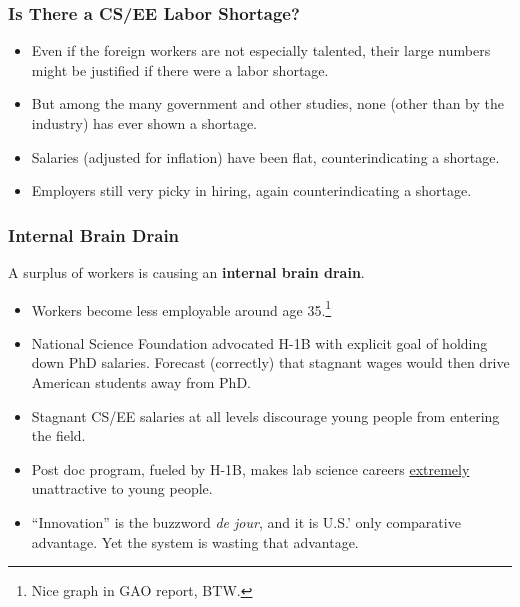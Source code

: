 \documentclass{beamer}
\begin{document}
\begin{frame}
\frametitle{Is There a CS/EE Labor Shortage?}

\pause

\begin{itemize}

\item Even if the foreign workers are not especially talented, their
large numbers might be justified if there were a labor shortage.
\pause

\item But among the many government and other studies, none (other than
by the industry) has ever shown a shortage.  
\pause

\item Salaries (adjusted for inflation) have been flat, 
counterindicating a shortage.  
\pause

\item Employers still very picky in hiring, again counterindicating a
shortage.

\end{itemize}

\end{frame}

\begin{frame}
\frametitle{Internal Brain Drain}

\pause

A surplus of workers is causing an {\bf internal brain drain}.
\pause

\begin{itemize}

\item Workers become less employable around age 35.\footnote{Nice graph
in GAO report, BTW.} 
\pause

\item National Science Foundation advocated H-1B with explicit goal of
holding down PhD salaries.
\pause
Forecast (correctly) that stagnant wages would then drive American 
students away from PhD.  
\pause 

\item Stagnant CS/EE salaries at all levels discourage young people from
entering the field.
\pause

\item Post doc program, fueled by H-1B, makes lab science careers
\underline{extremely} unattractive to young people.
\pause

\item ``Innovation'' is the buzzword {\it de jour}, and it is U.S.' only
comparative advantage.  Yet the system is wasting that advantage.

\end{itemize}

\end{frame}
\end{document}
